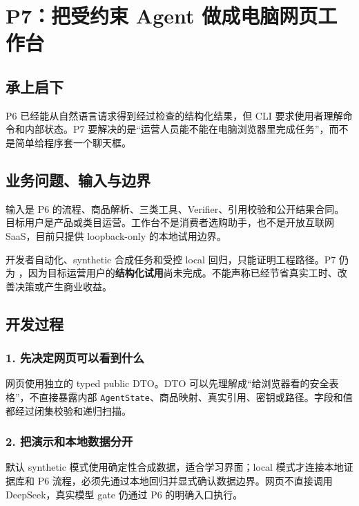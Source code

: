 \chapter{P7：把受约束 Agent 做成电脑网页工作台}

\section{承上启下}

P6 已经能从自然语言请求得到经过检查的结构化结果，但 CLI 要求使用者理解命令和内部状态。P7 要解决的是“运营人员能不能在电脑浏览器里完成任务”，而不是简单给程序套一个聊天框。

\section{业务问题、输入与边界}

输入是 P6 的流程、商品解析、三类工具、Verifier、引用校验和公开结果合同。目标用户是产品或类目运营。工作台不是消费者选购助手，也不是开放互联网 SaaS，目前只提供 loopback-only 的本地试用边界。

\begin{boundarybox}
开发者自动化、synthetic 合成任务和受控 local 回归，只能证明工程路径。P7 仍为 \statusprogress，因为目标运营用户的\textbf{结构化试用}尚未完成。不能声称已经节省真实工时、改善决策或产生商业收益。
\end{boundarybox}

\section{开发过程}

\subsection{1. 先决定网页可以看到什么}

网页使用独立的 typed public DTO。DTO 可以先理解成“给浏览器看的安全表格”，不直接暴露内部 \texttt{AgentState}、商品映射、真实引用、密钥或路径。字段和值都经过闭集校验和递归扫描。

\subsection{2. 把演示和本地数据分开}

默认 synthetic 模式使用确定性合成数据，适合学习界面；local 模式才连接本地证据库和 P6 流程，必须先通过本地回归并显式确认数据边界。网页不直接调用 DeepSeek，真实模型 gate 仍通过 P6 的明确入口执行。

